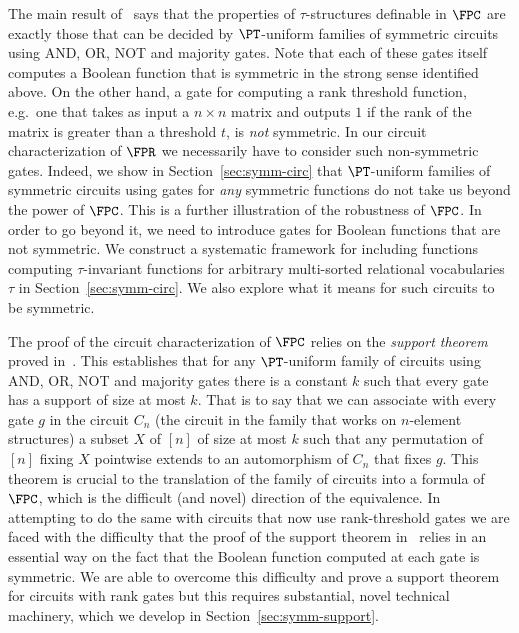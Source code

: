 \documentclass[a4paper,UKenglish]{lipics-v2018}
\begin{document}
The main result of~\cite{AndersonD17} says that the properties of
$\tau$-structures definable in $\FPC$ are exactly those that can be decided by
$\PT$-uniform families of symmetric circuits using AND, OR, NOT and majority
gates. Note that each of these gates itself computes a Boolean function that is
symmetric in the strong sense identified above. On the other hand, a gate for
computing a rank threshold function, e.g.\ one that takes as input a $n \times
n$ matrix and outputs $1$ if the rank of the matrix is greater than a threshold
$t$, is \emph{not} symmetric. In our circuit characterization of $\FPR$ we
necessarily have to consider such non-symmetric gates. Indeed, we show in
Section~\ref{sec:symm-circ} that $\PT$-uniform families of symmetric circuits
using gates for \emph{any} symmetric functions do not take us beyond the power
of $\FPC$. This is a further illustration of the robustness of $\FPC$. In order
to go beyond it, we need to introduce gates for Boolean functions that are not
symmetric. We construct a systematic framework for including functions computing
$\tau$-invariant functions for arbitrary multi-sorted relational vocabularies
$\tau$ in Section~\ref{sec:symm-circ}. We also explore what it means for such
circuits to be symmetric.

The proof of the circuit characterization of $\FPC$ relies on the \emph{support
  theorem} proved in~\cite{AndersonD17}. This establishes that for any
$\PT$-uniform family of circuits using AND, OR, NOT and majority gates there is
a constant $k$ such that every gate has a support of size at most $k$. That is
to say that we can associate with every gate $g$ in the circuit $C_n$ (the
circuit in the family that works on $n$-element structures) a subset $X$ of
$[n]$ of size at most $k$ such that any permutation of $[n]$ fixing $X$
pointwise extends to an automorphism of $C_n$ that fixes $g$. This theorem is
crucial to the translation of the family of circuits into a formula of $\FPC$,
which is the difficult (and novel) direction of the equivalence. In attempting
to do the same with circuits that now use rank-threshold gates we are faced with
the difficulty that the proof of the support theorem in~\cite{AndersonD17}
relies in an essential way on the fact that the Boolean function computed at
each gate is symmetric. We are able to overcome this difficulty and prove a
support theorem for circuits with rank gates but this requires substantial,
novel technical machinery, which we develop in Section~\ref{sec:symm-support}.
\end{document}

